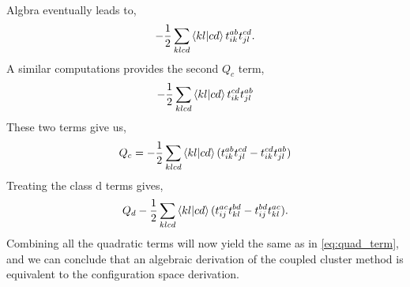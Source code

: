 Algbra eventually leads to,
\begin{equation}
    - \frac{1}{2} \sum_{klcd} \bra{kl} \ket{cd}
        t^{ab}_{ik} t^{cd}_{jl}.
\end{equation}
A similar computations provides the second $Q_c$ term,
\begin{equation}
    - \frac{1}{2} \sum_{klcd} \bra{kl} \ket{cd}
        t^{cd}_{ik} t^{ab}_{jl}
\end{equation}
These two terms give us,
\begin{equation}
    Q_c = - \frac{1}{2} \sum_{klcd} \bra{kl} \ket{cd}
        (t^{ab}_{ik}t^{cd}_{jl} - t^{cd}_{ik}t^{ab}_{jl})
\end{equation}
Treating the class d terms gives,
\begin{equation}
    Q_d - \frac{1}{2} \sum_{klcd} \bra{kl} \ket{cd}
        (t^{ac}_{ij}t^{bd}_{kl} - t^{bd}_{ij}t^{ac}_{kl}).
\end{equation}
Combining all the quadratic terms will now yield the same as in 
\autoref{eq:quad_term}, and we can conclude that an algebraic 
derivation of the coupled cluster method is equivalent to the 
configuration space derivation.